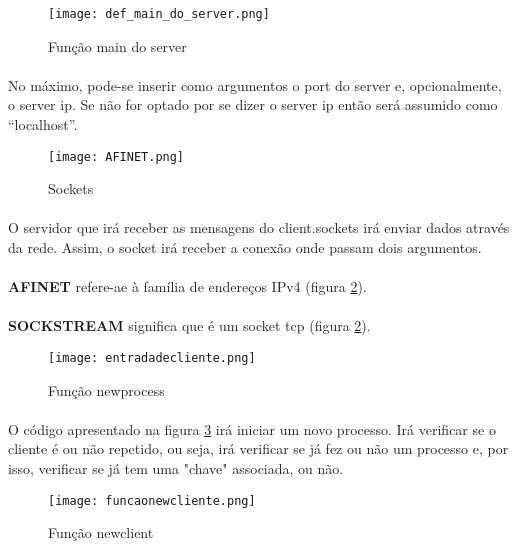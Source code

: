 \documentclass[a4paper,11pt,onecolumn,oneside]{article}
\begin{document}
\begin{figure} [h]
\center
\texttt{[image: def\_main\_do\_server.png]}
\caption{Função main do server}
\label{main server}
\end{figure}

\paragraph{ }
No máximo, pode-se inserir como argumentos o port do server e, opcionalmente, o server ip.
Se não for optado por se dizer o server ip então será assumido como “localhost”.

\begin{figure} [h]
\center
\texttt{[image: AFINET.png]}
\caption{Sockets}
\label{Sockets}
\end{figure}

\paragraph{ }
O servidor que irá receber as mensagens do client.sockets irá enviar dados através da rede. Assim, o socket irá receber a conexão onde passam dois argumentos.
\paragraph{ }
\textbf{AF\textunderscore INET} refere-ae à família de endereços IPv4 (figura \ref{Sockets}).
\paragraph{ }
\textbf{SOCK\textunderscore STREAM} significa que é um socket \ac{tcp} (figura \ref{Sockets}).

\begin{figure} [h]
\center
\texttt{[image: entradadecliente.png]}
\caption{Função new\textunderscore process}
\label{process}
\end{figure}

\paragraph{ }
O código apresentado na figura \ref{process} irá iniciar um novo processo. Irá verificar se o cliente é ou não repetido, ou seja, irá verificar se já fez ou não um processo e, por isso, verificar se já tem uma "chave" associada, ou não.

\begin{figure} [h]
\center
\texttt{[image: funcaonewcliente.png]}
\caption{Função new\textunderscore client}
\label{client}
\end{figure}
\end{document}
